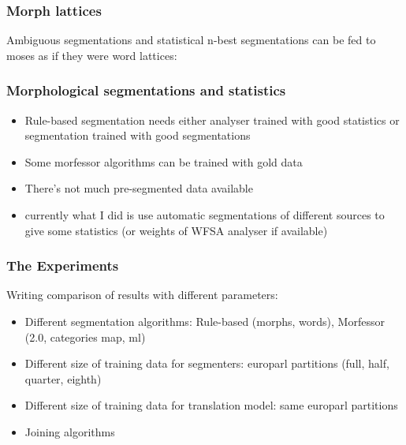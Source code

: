 \documentclass{beamer}
\begin{document}
\begin{frame}
    \frametitle{Morph lattices}
    Ambiguous segmentations and statistical n-best segmentations can be fed to
    moses as if they were word lattices:
\end{frame}

\begin{frame}
    \frametitle{Morphological segmentations and statistics}
    \begin{itemize}
        \item Rule-based segmentation needs either analyser trained with
            good statistics or segmentation trained with good segmentations
        \item Some morfessor algorithms can be trained with gold data
        \item There's not much pre-segmented data available
        \item currently what I did is use automatic segmentations of different
            sources to give some statistics (or weights of WFSA analyser if
            available)
    \end{itemize}
\end{frame}

\begin{frame}
    \frametitle{The Experiments}
    Writing comparison of results with different parameters:
    \begin{itemize}
        \item Different segmentation algorithms: Rule-based (morphs,
            words), Morfessor (2.0, categories map, ml)
        \item Different size of training data for segmenters: europarl
            partitions (full, half, quarter, eighth)
        \item Different size of training data for translation model:
            same europarl partitions
        \item Joining algorithms
    \end{itemize}
\end{frame}
\end{document}
